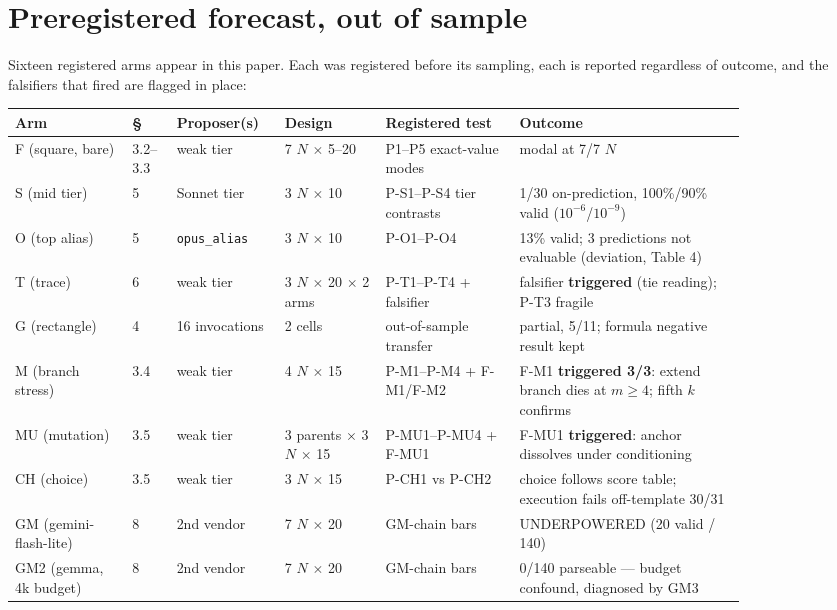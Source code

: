 \section{Preregistered forecast, out of sample}

Sixteen registered arms appear in this paper. Each was registered before its sampling, each
is reported regardless of outcome, and the falsifiers that fired are flagged in place:

\begin{center}
\begin{small}
\setlength{\tabcolsep}{3.5pt}
\begin{tabular}{@{}p{0.14\linewidth}p{0.05\linewidth}p{0.11\linewidth}p{0.12\linewidth}p{0.16\linewidth}p{0.27\linewidth}@{}}
\toprule
Arm & \S & Proposer(s) & Design & Registered test & Outcome \\
\midrule
F (square, bare) & 3.2--3.3 & weak tier & 7 $N$ $\times$ 5--20 & P1--P5 exact-value modes & modal at 7/7 $N$ \\
S (mid tier) & 5 & Sonnet tier & 3 $N$ $\times$ 10 & P-S1--P-S4 tier contrasts & 1/30 on-prediction, 100\%/90\% valid ($10^{-6}$/$10^{-9}$) \\
O (top alias) & 5 & \texttt{opus\_alias} & 3 $N$ $\times$ 10 & P-O1--P-O4 & 13\% valid; 3 predictions not evaluable (deviation, Table 4) \\
T (trace) & 6 & weak tier & 3 $N$ $\times$ 20 $\times$ 2 arms & P-T1--P-T4 + falsifier & falsifier \textbf{triggered} (tie reading); P-T3 fragile \\
G (rectangle) & 4 & 16 invocations & 2 cells & out-of-sample transfer & partial, 5/11; formula negative result kept \\
M (branch stress) & 3.4 & weak tier & 4 $N$ $\times$ 15 & P-M1--P-M4 + F-M1/F-M2 & F-M1 \textbf{triggered 3/3}: extend branch dies at $m \ge 4$; fifth $k$ confirms \\
MU (mutation) & 3.5 & weak tier & 3 parents $\times$ 3 $N$ $\times$ 15 & P-MU1--P-MU4 + F-MU1 & F-MU1 \textbf{triggered}: anchor dissolves under conditioning \\
CH (choice) & 3.5 & weak tier & 3 $N$ $\times$ 15 & P-CH1 vs P-CH2 & choice follows score table; execution fails off-template 30/31 \\
GM (gemini-flash-lite) & 8 & 2nd vendor & 7 $N$ $\times$ 20 & GM-chain bars & UNDERPOWERED (20 valid / 140) \\
GM2 (gemma, 4k budget) & 8 & 2nd vendor & 7 $N$ $\times$ 20 & GM-chain bars & 0/140 parseable --- budget confound, diagnosed by GM3 \\

\end{tabular}
\end{small}
\end{center}
